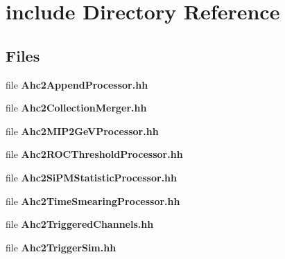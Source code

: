 \section{include Directory Reference}
\label{dir_001c1035ece57bb6803adeecbfe8be29}
\subsection*{Files}
\begin{DoxyCompactItemize}
\item 
file {\bfseries Ahc2\-Append\-Processor.\-hh}
\item 
file {\bfseries Ahc2\-Collection\-Merger.\-hh}
\item 
file {\bfseries Ahc2\-M\-I\-P2\-Ge\-V\-Processor.\-hh}
\item 
file {\bfseries Ahc2\-R\-O\-C\-Threshold\-Processor.\-hh}
\item 
file {\bfseries Ahc2\-Si\-P\-M\-Statistic\-Processor.\-hh}
\item 
file {\bfseries Ahc2\-Time\-Smearing\-Processor.\-hh}
\item 
file {\bfseries Ahc2\-Triggered\-Channels.\-hh}
\item 
file {\bfseries Ahc2\-Trigger\-Sim.\-hh}
\end{DoxyCompactItemize}
